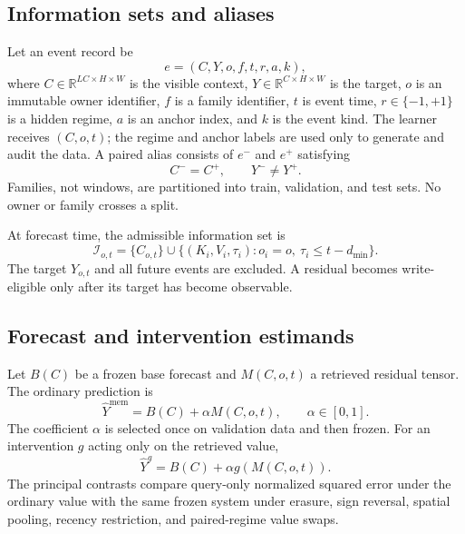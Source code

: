 \documentclass[11pt]{article}
\newcommand{\R}{\mathbb{R}}
\begin{document}
\subsection{Information sets and aliases}

Let an event record be
\begin{equation}
  e=(C,Y,o,f,t,r,a,k),
\end{equation}
where $C\in\R^{LC\times H\times W}$ is the visible context, $Y\in
\R^{C\times H\times W}$ is the target, $o$ is an immutable owner identifier,
$f$ is a family identifier, $t$ is event time, $r\in\{-1,+1\}$ is a hidden
regime, $a$ is an anchor index, and $k$ is the event kind. The learner receives
$(C,o,t)$; the regime and anchor labels are used only to generate and audit the
data. A paired alias consists of $e^-$ and $e^+$ satisfying
\begin{equation}
 C^- = C^+, \qquad Y^- \neq Y^+ .
\end{equation}
Families, not windows, are partitioned into train, validation, and test sets.
No owner or family crosses a split.

At forecast time, the admissible information set is
\begin{equation}
 \mathcal{I}_{o,t}=\{C_{o,t}\}\cup
 \{(K_i,V_i,\tau_i):o_i=o,\ \tau_i\le t-d_{\min}\}.
\end{equation}
The target $Y_{o,t}$ and all future events are excluded. A residual becomes
write-eligible only after its target has become observable.

\subsection{Forecast and intervention estimands}

Let $B(C)$ be a frozen base forecast and $M(C,o,t)$ a retrieved residual
tensor. The ordinary prediction is
\begin{equation}
 \widehat{Y}^{\mathrm{mem}}=B(C)+\alpha M(C,o,t),
 \qquad \alpha\in[0,1].
\end{equation}
The coefficient $\alpha$ is selected once on validation data and then frozen.
For an intervention $g$ acting only on the retrieved value,
\begin{equation}
 \widehat{Y}^{g}=B(C)+\alpha g(M(C,o,t)).
\end{equation}
The principal contrasts compare query-only normalized squared error under the
ordinary value with the same frozen system under erasure, sign reversal,
spatial pooling, recency restriction, and paired-regime value swaps.
\end{document}
